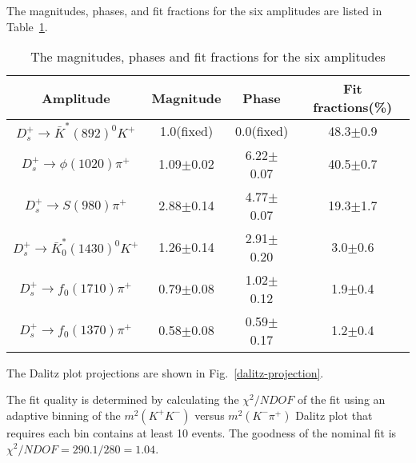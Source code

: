 {The magnitudes, phases, and fit fractions for the six amplitudes are listed in Table~\ref{fit-result}.
\begin{table}[htbp]
    \caption{The magnitudes, phases and fit fractions for the six amplitudes}
    \label{fit-result}
    \begin{center}
    \begin{tabular}{cccc}
        \toprule
        Amplitude & Magnitude  & Phase  & Fit fractions(\%)\\
        \hline
        $D_{s}^{+} \rightarrow \bar{K}^{*}(892)^{0}K^{+}$              & 1.0(fixed)     & 0.0(fixed)    & 48.3$\pm$0.9\\
        $D_{s}^{+} \rightarrow \phi(1020)\pi^{+}$                      & 1.09$\pm$0.02  & 6.22$\pm$0.07 & 40.5$\pm$0.7\\
        $D_{s}^{+} \rightarrow S(980)\pi^{+}$    & 2.88$\pm$0.14  & 4.77$\pm$0.07 & 19.3$\pm$1.7\\
        $D_{s}^{+} \rightarrow \bar{K}^{*}_{0}(1430)^{0}K^{+}$         & 1.26$\pm$0.14  & 2.91$\pm$0.20 & 3.0$\pm$0.6\\
        $D_{s}^{+} \rightarrow f_{0}(1710)\pi^{+}$                     & 0.79$\pm$0.08  & 1.02$\pm$0.12 & 1.9$\pm$0.4\\
        $D_{s}^{+} \rightarrow f_{0}(1370)\pi^{+}$                     & 0.58$\pm$0.08  & 0.59$\pm$0.17 & 1.2$\pm$0.4\\
        \bottomrule
    \end{tabular}
\end{center}
\end{table}

The Dalitz plot projections are shown in Fig.~\ref{dalitz-projection}.
The fit quality is determined by calculating the $\chi^{2}/NDOF$ of the fit using an adaptive binning of the $m^{2}(K^{+}K^{-})$ versus $m^{2}(K^{-}\pi^{+})$ Dalitz plot that requires each bin contains at least 10 events.
The goodness of the nominal fit is $\chi^{2}/NDOF=290.1/280=1.04$.  

}
